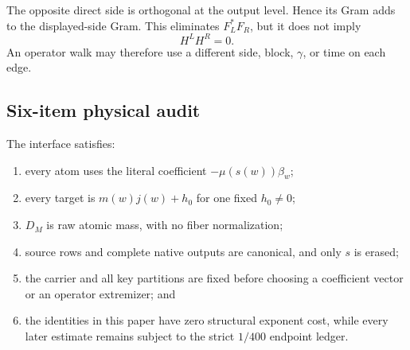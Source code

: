 The opposite direct side is orthogonal at the output level.  Hence its Gram
adds to the displayed-side Gram.  This eliminates \(F_L^*F_R\), but it does
not imply
\[
 H^LH^R=0.
\]
An operator walk may therefore use a different side, block, \(\gamma\), or
time on each edge.

\subsection{Six-item physical audit}

The interface satisfies:
\begin{enumerate}[label=\textup{(L1.\arabic*)},leftmargin=4em]
 \item every atom uses the literal coefficient
       \(-\mu(s(w))\beta_w\);
 \item every target is \(m(w)j(w)+h_0\) for one fixed \(h_0\ne0\);
 \item \(D_M\) is raw atomic mass, with no fiber normalization;
 \item source rows and complete native outputs are canonical, and only
       \(s\) is erased;
 \item the carrier and all key partitions are fixed before choosing a
       coefficient vector or an operator extremizer; and
 \item the identities in this paper have zero structural exponent cost,
       while every later estimate remains subject to the strict \(1/400\)
       endpoint ledger.
\end{enumerate}
